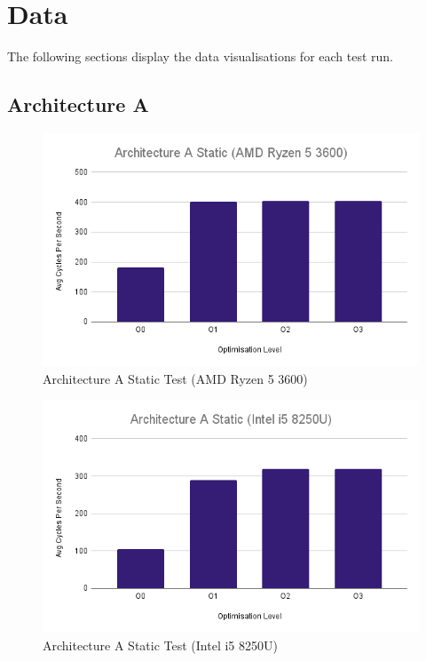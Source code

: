 \documentclass{article}
\begin{document}
\clearpage

\section{Data}
The following sections display the data visualisations for each test run.

\subsection{Architecture A}
\begin{figure}[!h]
\centering
\includegraphics[scale=0.5]{Architecture A Static (AMD Ryzen 5 3600).png}
\caption{Architecture A Static Test (AMD Ryzen 5 3600)}
\label{arch_a_static_pc}
\end{figure}

\begin{figure}[!h]
\centering
\includegraphics[scale=0.5]{Architecture A Static (Intel i5 8250U).png}
\caption{Architecture A Static Test (Intel i5 8250U)}
\label{arch_a_static_laptop}
\end{figure}
\end{document}
